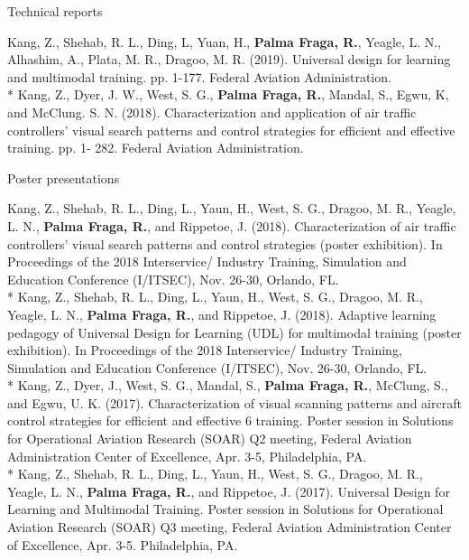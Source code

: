 \documentclass[a4paper,10pt]{article}
\newlength{\cvcolumngapwidth}
\newlength{\cvleftcolumnwidth}
\newlength{\cvrightcolumnwidth}
\newcommand{\cvheadingstyle}[1]{{\normalsize\cvheadingfont\textcolor{cvheadingcolor}{#1}}}
\newlength{\cvafteritemskipamount}
\newlength{\cvparskip}
\newcommand{\cvitem}[2]{
    \begin{minipage}[t]{\cvleftcolumnwidth}
        \raggedleft #1
    \end{minipage}%
    \hspace{\cvcolumngapwidth}%
    \begin{minipage}[t]{\cvrightcolumnwidth}
        \setlength{\parskip}{\cvparskip} #2
    \end{minipage}

    \vspace{\cvafteritemskipamount}
}
\begin{document}
\cvitem{
    \cvheadingstyle{Technical reports}
}{
    Kang, Z., Shehab, R. L., Ding, L, Yuan, H., \textbf{Palma Fraga, R.}, Yeagle, L. N., Alhashim, A., Plata, M. R., Dragoo, M. R. (2019). Universal design for learning and multimodal training. pp. 1-177. Federal Aviation Administration.
    \vspace{0.3cm}
    \\* Kang, Z., Dyer, J. W., West, S. G., \textbf{Palma Fraga, R.}, Mandal, S., Egwu, K, and McClung. S. N. (2018). Characterization and application of air traffic controllers’ visual search patterns and control strategies for efficient and effective training. pp. 1- 282. Federal Aviation Administration.


}
\cvitem{
    \cvheadingstyle{Poster presentations}
}{
    Kang, Z., Shehab, R. L., Ding, L., Yaun, H., West, S. G., Dragoo, M. R., Yeagle, L. N., \textbf{Palma Fraga, R.}, and Rippetoe, J. (2018). Characterization of air traffic controllers’ visual search patterns and control strategies (poster exhibition). In Proceedings of the 2018 Interservice/ Industry Training, Simulation and Education Conference (I/ITSEC), Nov. 26-30, Orlando, FL.
    \vspace{0.3cm}
    \\* Kang, Z., Shehab, R. L., Ding, L., Yaun, H., West, S. G., Dragoo, M. R., Yeagle, L. N., \textbf{Palma Fraga, R.}, and Rippetoe, J. (2018). Adaptive learning pedagogy of Universal Design for Learning (UDL) for multimodal training (poster exhibition). In Proceedings of the 2018 Interservice/ Industry Training, Simulation and Education Conference (I/ITSEC), Nov. 26-30, Orlando, FL.
    \vspace{0.3cm}
    \\* Kang, Z., Dyer, J., West, S. G., Mandal, S., \textbf{Palma Fraga, R.}, McClung, S., and Egwu, U. K. (2017). Characterization of visual scanning patterns and aircraft control strategies for efficient and effective 6 training. Poster session in Solutions for Operational Aviation Research (SOAR) Q2 meeting, Federal Aviation Administration Center of Excellence, Apr. 3-5, Philadelphia, PA.
    \vspace{0.3cm}
    \\* Kang, Z., Shehab, R. L., Ding, L., Yaun, H., West, S. G., Dragoo, M. R., Yeagle, L. N., \textbf{Palma Fraga, R.}, and Rippetoe, J. (2017). Universal Design for Learning and Multimodal Training. Poster session in Solutions for Operational Aviation Research (SOAR) Q3 meeting, Federal Aviation Administration Center of Excellence, Apr. 3-5. Philadelphia, PA. 
}
\end{document}
